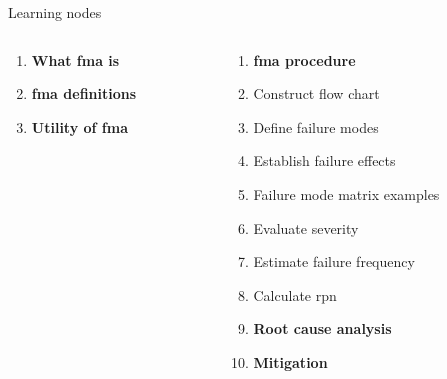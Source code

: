 \documentclass[aspectratio=1610,pdftex,dvipsnames,compress,xcolor={dvipsnames}]{beamer}
\newcommand{\acf}{\acrfull} %
\newcommand{\acs}{\acrshort} %
\begin{document}
\begin{frame}{Learning nodes}
    \begin{columns}[t]

        \begin{column}{0.50\textwidth}
            \begin{enumerate}[series=outerlist,topsep=0pt,itemsep=1pt,leftmargin=*,label=(\arabic*)]
                \item[]\textbf{What \acs{fma} is}
                    \vspace{0.10in}
                \item[]\textbf{\acs{fma} definitions}
                    \vspace{0.10in}
                \item[]\textbf{Utility of \acs{fma}}
            \end{enumerate}
        \end{column}

        \begin{column}{0.50\textwidth}
            \begin{enumerate}[series=outerlist,topsep=0pt,itemsep=1pt,leftmargin=*,label=(\arabic*)]
                \item[]\hfill\textbf{\acs{fma} procedure}
                \item[]\hfill Construct flow chart
                \item[]\hfill Define failure modes  
                \item[]\hfill Establish failure effects  
                \item[]\hfill Failure mode matrix examples  
                \item[]\hfill Evaluate severity  
                \item[]\hfill Estimate failure frequency  
                \item[]\hfill Calculate \acf{rpn}
                    \vspace{0.10in}
                \item[]\hfill\textbf{Root cause analysis}
                    \vspace{0.10in}
                \item[]\hfill\textbf{Mitigation}
            \end{enumerate}
        \end{column}

    \end{columns}
\end{frame}
\end{document}
